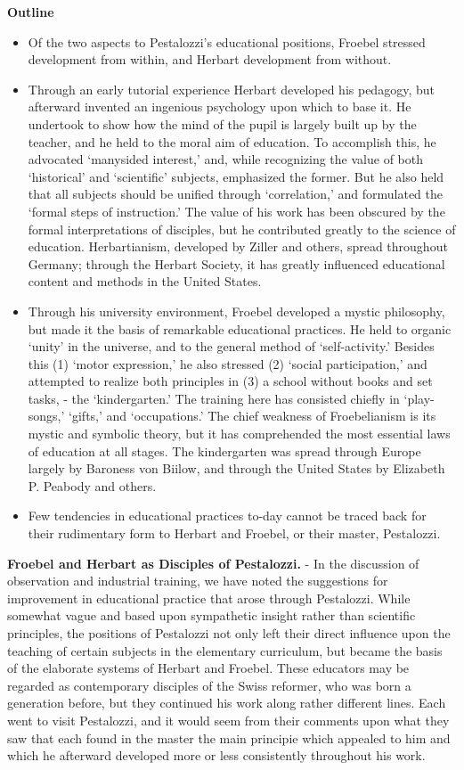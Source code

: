\documentclass[]{book}
\providecommand{\tightlist}{%
  \setlength{\itemsep}{0pt}\setlength{\parskip}{0pt}}
\begin{document}
\textbf{Outline}

\begin{itemize}
\tightlist
\item
  Of the two aspects to Pestalozzi's educational positions, Froebel stressed development from within, and Herbart development from without.
\item
  Through an early tutorial experience Herbart developed his pedagogy, but afterward invented an ingenious psychology upon which to base it. He undertook to show how the mind of the pupil is largely built up by the teacher, and he held to the moral aim of education. To accomplish this, he advocated `manysided interest,' and, while recognizing the value of both `historical' and `scientific' subjects, emphasized the former. But he also held that all subjects should be unified through `correlation,' and formulated the `formal steps of instruction.' The value of his work has been obscured by the formal interpretations of disciples, but he contributed greatly to the science of education. Herbartianism, developed by Ziller and others, spread throughout Germany; through the Herbart Society, it has greatly influenced educational content and methods in the United States.
\item
  Through his university environment, Froebel developed a mystic philosophy, but made it the basis of remarkable educational practices. He held to organic `unity' in the universe, and to the general method of `self-activity.' Besides this (1) `motor expression,' he also stressed (2) `social participation,' and attempted to realize both principles in (3) a school without books and set tasks, - the `kindergarten.' The training here has consisted chiefly in `play-songs,' `gifts,' and `occupations.' The chief weakness of Froebelianism is its mystic and symbolic theory, but it has comprehended the most essential laws of education at all stages. The kindergarten was spread through Europe largely by Baroness von Biilow, and through the United States by Elizabeth P. Peabody and others.
\item
  Few tendencies in educational practices to-day cannot be traced back for their rudimentary form to Herbart and Froebel, or their master, Pestalozzi.
\end{itemize}

\textbf{Froebel and Herbart as Disciples of Pestalozzi.} - In the discussion of observation and industrial training, we have noted the suggestions for improvement in educational practice that arose through Pestalozzi. While somewhat vague and based upon sympathetic insight rather than scientific principles, the positions of Pestalozzi not only left their direct influence upon the teaching of certain subjects in the elementary curriculum, but became the basis of the elaborate systems of Herbart and Froebel. These educators may be regarded as contemporary disciples of the Swiss reformer, who was born a generation before, but they continued his work along rather different lines. Each went to visit Pestalozzi, and it would seem from their comments upon what they saw that each found in the master the main principie which appealed to him and which he afterward developed more or less consistently throughout his work.
\end{document}

